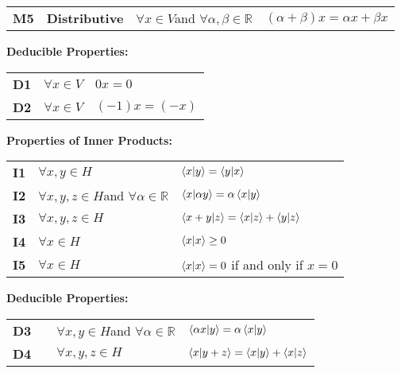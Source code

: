 \documentclass[12pt]{article}
\begin{document}
\begin{table}
\begin{center}
\begin{tabular}{llll}
  {\bf M5} & {\bf Distributive} & $\forall x \in V$and $\forall \alpha,\beta \in \mathbb{R}$ & $ (\alpha + \beta)x = \alpha x + \beta x $ \\
\end{tabular}
\vskip 0.5cm
{\bf Deducible Properties:}\\
\begin{tabular}{lll}
{\bf D1}  & $\forall x \in V $  & $0x = 0$ \\
{\bf D2}  & $\forall x \in V $  & $(-1)x = (-x)$ \\
\end{tabular}
\vskip 0.5cm
{\bf Properties of Inner Products:}\\
\begin{tabular}{lll}
  {\bf I1} & $\forall x,y \in H$ & $\braket{x|y} = \braket{y|x}$\\
{\bf I2} & $\forall x,y,z \in H$and $\forall \alpha \in \mathbb{R}$ &
$\braket{x|\alpha y} = \alpha \braket{x|y}$\\
{\bf I3} & $\forall x,y,z \in H$ & $\braket{x+y|z} = \braket{x|z}+\braket{y|z}$\\
{\bf I4} & $\forall x \in H$ & $\braket{x|x} \geq 0$ \\
{\bf I5} & $\forall x \in H$ & $\braket{x|x}=0$ if and only if $x=0$ \\
\end{tabular}
\vskip 0.5cm
{\bf Deducible Properties:}\\
\begin{tabular}{llll}
{\bf D3} & & $\forall x,y \in H$and $\forall \alpha \in \mathbb{R}$ &
$\braket{\alpha x|y} = \alpha \braket{x|y}$\\
{\bf D4} & & $\forall x,y,z \in H$ &
$\braket{x|y+z} = \braket{x|y}+\braket{x|z}$\\
\end{tabular}
\end{center}
\end{table}

\newpage

       
\end{document}
